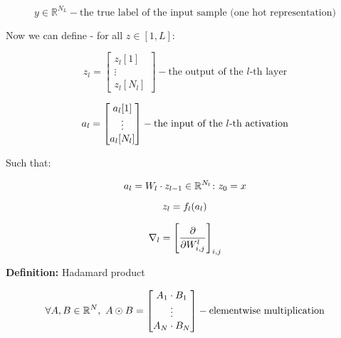 \begin{equation}
    y \in \mathbb{R}^{N_L} - \text{the true label of the input sample (one hot representation)}
\end{equation}

Now we can define - for all \( z \in [1, L] \):

\begin{equation} \label{eq:backprop_def}
    z_l = \begin{bmatrix} z_l[1] \\ \vdots \\ z_l[N_l] \end{bmatrix} - \text{the output of the \(l\)-th layer}
\end{equation}

\begin{equation} \notag
    a_l = \begin{bmatrix} a_l[1] \\ \vdots \\ a_l[N_l] \end{bmatrix} - \text{the input of the \(l\)-th activation}
\end{equation}

Such that:

\begin{equation} \notag
    a_l = W_l \cdot z_{l-1} \in \mathbb{R}^{N_l} \colon z_0 = x
\end{equation}

\begin{equation} \notag
    z_l = f_l(a_l)
\end{equation}

\begin{equation} \notag
    \nabla_l = \left[ \frac{\partial}{\partial W_{i,j}^l} \right]_{i,j}
\end{equation}

\begin{mdframed}[backgroundcolor=gray_background, linewidth=0pt]
    \textbf{Definition:} Hadamard product

    \begin{equation} \notag
        \forall A, B \in \mathbb{R}^N, \ A \odot B = \begin{bmatrix} A_1 \cdot B_1 \\ \vdots \\     A_N \cdot B_N \end{bmatrix} - \text{elementwise multiplication}
    \end{equation}
    
\end{mdframed}




